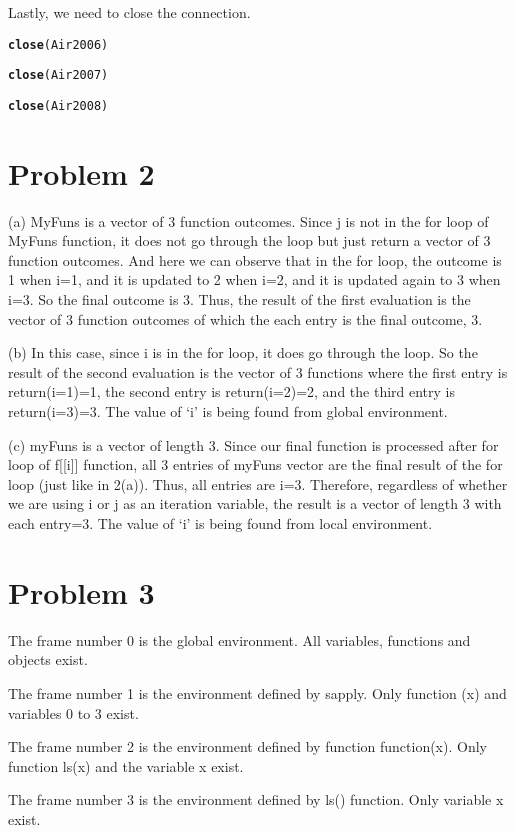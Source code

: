 \documentclass[english]{article}\usepackage[]{graphicx}\usepackage[]{color}
\makeatletter
\newcommand{\hlstd}[1]{\textcolor[rgb]{0.345,0.345,0.345}{#1}}%
\newcommand{\hlkwd}[1]{\textcolor[rgb]{0.737,0.353,0.396}{\textbf{#1}}}%
\newenvironment{kframe}{%
 \def\at@end@of@kframe{}%
 \ifinner\ifhmode%
  \def\at@end@of@kframe{\end{minipage}}%
  \begin{minipage}{\columnwidth}%
 \fi\fi%
 \def\FrameCommand##1{\hskip\@totalleftmargin \hskip-\fboxsep
 \colorbox{shadecolor}{##1}\hskip-\fboxsep
     \hskip-\linewidth \hskip-\@totalleftmargin \hskip\columnwidth}%
 \MakeFramed {\advance\hsize-\width
   \@totalleftmargin\z@ \linewidth\hsize
   \@setminipage}}%
 {\par\unskip\endMakeFramed%
 \at@end@of@kframe}
\newenvironment{knitrout}{}{} %
\makeatother
\begin{document}
Lastly, we need to close the connection.

\begin{knitrout}
\color{fgcolor}\begin{kframe}
\begin{alltt}
\hlkwd{close}\hlstd{(Air2006)}

\hlkwd{close}\hlstd{(Air2007)}

\hlkwd{close}\hlstd{(Air2008)}
\end{alltt}
\end{kframe}
\end{knitrout}


\section*{Problem 2}

(a) MyFuns is a vector of 3 function outcomes. Since j is not in the
for loop of MyFuns function, it does not go through the loop but just
return a vector of 3 function outcomes. And here we can observe that
in the for loop, the outcome is 1 when i=1, and it is updated to 2
when i=2, and it is updated again to 3 when i=3. So the final outcome
is 3. Thus, the result of the first evaluation is the vector of 3
function outcomes of which the each entry is the final outcome, 3.

(b) In this case, since i is in the for loop, it does go through the
loop. So the result of the second evaluation is the vector of 3 functions
where the first entry is return(i=1)=1, the second entry is return(i=2)=2,
and the third entry is return(i=3)=3. The value of \textquoteleft i\textquoteright{}
is being found from global environment.

(c) myFuns is a vector of length 3. Since our final function is processed
after for loop of f{[}{[}i{]}{]} function, all 3 entries of myFuns
vector are the final result of the for loop (just like in 2(a)). Thus,
all entries are i=3. Therefore, regardless of whether we are using
i or j as an iteration variable, the result is a vector of length
3 with each entry=3. The value of \textquoteleft i\textquoteright{}
is being found from local environment.


\section*{Problem 3}

The frame number 0 is the global environment. All variables, functions
and objects exist. 

The frame number 1 is the environment defined by sapply. Only function
(x) and variables 0 to 3 exist. 

The frame number 2 is the environment defined by function function(x).
Only function ls(x) and the variable x exist. 

The frame number 3 is the environment defined by ls() function. Only
variable x exist.
\end{document}

